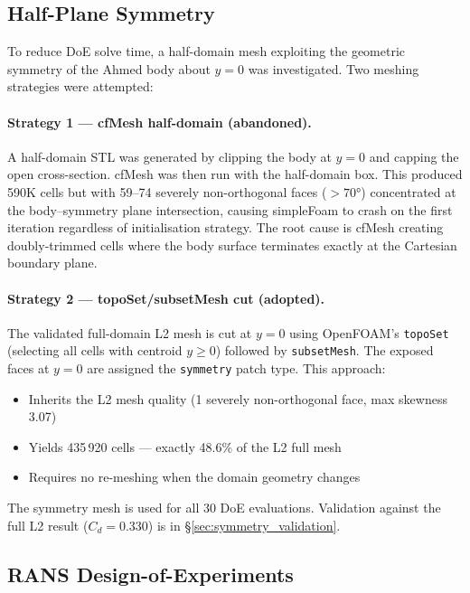 \subsection{Half-Plane Symmetry}
\label{sec:symmetry}

To reduce DoE solve time, a half-domain mesh exploiting the geometric symmetry of the Ahmed body about $y=0$ was investigated. Two meshing strategies were attempted:

\paragraph{Strategy 1 — cfMesh half-domain (abandoned).}
A half-domain STL was generated by clipping the body at $y=0$ and capping the open cross-section. cfMesh was then run with the half-domain box. This produced 590K cells but with 59--74 severely non-orthogonal faces ($>70°$) concentrated at the body--symmetry plane intersection, causing simpleFoam to crash on the first iteration regardless of initialisation strategy. The root cause is cfMesh creating doubly-trimmed cells where the body surface terminates exactly at the Cartesian boundary plane.

\paragraph{Strategy 2 — topoSet/subsetMesh cut (adopted).}
The validated full-domain L2 mesh is cut at $y=0$ using OpenFOAM's \texttt{topoSet} (selecting all cells with centroid $y \geq 0$) followed by \texttt{subsetMesh}. The exposed faces at $y=0$ are assigned the \texttt{symmetry} patch type. This approach:
\begin{itemize}[noitemsep]
    \item Inherits the L2 mesh quality (1 severely non-orthogonal face, max skewness 3.07)
    \item Yields 435\,920 cells — exactly 48.6\% of the L2 full mesh
    \item Requires no re-meshing when the domain geometry changes
\end{itemize}

The symmetry mesh is used for all 30 DoE evaluations. Validation against the full L2 result ($C_d = 0.330$) is in \S\ref{sec:symmetry_validation}.

\subsection{RANS Design-of-Experiments}
\label{sec:rans_doe}

